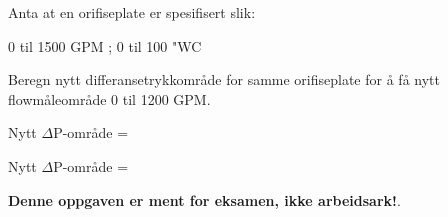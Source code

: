 

Anta at en orifiseplate er spesifisert slik:

\vskip 10pt

\hskip 40pt 0 til 1500 GPM ; 0 til 100 "WC

\vskip 10pt

Beregn nytt differansetrykkområde for samme orifiseplate for å få nytt flowmåleområde 0 til 1200 GPM.

\vskip 10pt

Nytt $\Delta$P-område = \underbar{\hskip 50pt}







Nytt $\Delta$P-område = 







{\bf Denne oppgaven er ment for eksamen, ikke arbeidsark!}.

